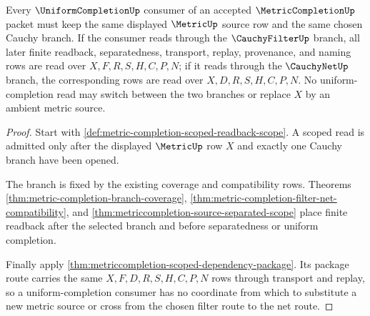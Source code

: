 \begin{theorem}
\label{thm:metric-completion-uniform-source-lock}
Every $\UniformCompletionUp$ consumer of an accepted $\MetricCompletionUp$ packet must keep the same displayed $\MetricUp$ source row and the same chosen Cauchy branch. If the consumer reads through the $\CauchyFilterUp$ branch, all later finite readback, separatedness, transport, replay, provenance, and naming rows are read over $X,F,R,S,H,C,P,N$; if it reads through the $\CauchyNetUp$ branch, the corresponding rows are read over $X,D,R,S,H,C,P,N$. No uniform-completion read may switch between the two branches or replace $X$ by an ambient metric source.
\end{theorem}
\begin{proof}
Start with \autoref{def:metric-completion-scoped-readback-scope}. A scoped read is admitted only after the displayed $\MetricUp$ row $X$ and exactly one Cauchy branch have been opened.

The branch is fixed by the existing coverage and compatibility rows. Theorems \autoref{thm:metric-completion-branch-coverage}, \autoref{thm:metric-completion-filter-net-compatibility}, and \autoref{thm:metriccompletion-source-separated-scope} place finite readback after the selected branch and before separatedness or uniform completion.

Finally apply \autoref{thm:metriccompletion-scoped-dependency-package}. Its package route carries the same $X,F,D,R,S,H,C,P,N$ rows through transport and replay, so a uniform-completion consumer has no coordinate from which to substitute a new metric source or cross from the chosen filter route to the net route.
\end{proof}

